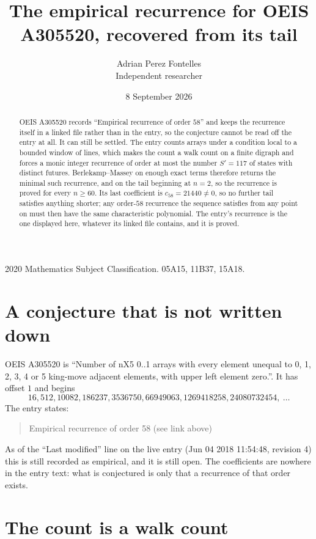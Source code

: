 \documentclass[11pt,a4paper]{article}
\title{The empirical recurrence for OEIS A305520, recovered from its tail}
\author{Adrian Perez Fontelles\\ \small Independent researcher}
\date{8 September 2026}
\theoremstyle{plain}
\theoremstyle{definition}
\begin{document}
\maketitle

\begin{abstract}
OEIS A305520 records ``Empirical recurrence of order $58$'' and keeps the recurrence itself in
a linked file rather than in the entry, so the conjecture cannot be read off the entry at all.
It can still be settled. The entry counts arrays under a condition local to a bounded window of
lines, which makes the count a walk count on a finite digraph and forces a monic integer
recurrence of order at most the number $S'=117$ of states with distinct futures. Berlekamp--Massey on
enough exact terms therefore returns the minimal such recurrence, and on the tail beginning at $n=2$, so the recurrence is proved for every $n\ge60$.
Its last coefficient is $c_{58}=21440\neq0$, so no further tail satisfies anything
shorter; any order-$58$ recurrence the sequence satisfies from any point on must then have
the same characteristic polynomial. The entry's recurrence is the one displayed here, whatever
its linked file contains, and it is proved.
\end{abstract}

\noindent\small 2020 Mathematics Subject Classification. 05A15, 11B37, 15A18.\normalsize

\section{A conjecture that is not written down}

OEIS A305520 is ``Number of nX5 0..1 arrays with every element unequal to 0, 1, 2, 3, 4 or 5 king-move adjacent elements, with upper left element zero.''. It has offset $1$ and begins
\[
16, 512, 10082, 186237, 3536750, 66949063, 1269418258, 24080732454,\ \dots
\]
The entry states:
\begin{quote}
Empirical recurrence of order 58 (see link above)
\end{quote}
As of the ``Last modified'' line on the live entry (Jun 04 2018 11:54:48, revision 4)
this is still recorded as empirical, and it is still open. The coefficients are nowhere in the
entry text: what is conjectured is only that a recurrence of that order exists.

\section{The count is a walk count}
\end{document}
